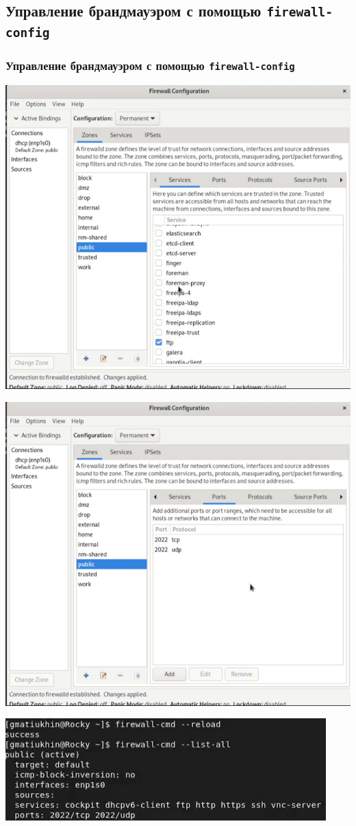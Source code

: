 \documentclass{beamer}
\begin{document}
\subsection{Управление брандмауэром с помощью \texttt{firewall-config}}
\begin{frame}[plain]
	\frametitle{Управление брандмауэром с помощью \texttt{firewall-config}}
	\includegraphics{12.png}
\end{frame}
\begin{frame}[plain]
	\includegraphics{13.png}
\end{frame}
\begin{frame}[plain]
	\includegraphics{14.png}
\end{frame}
\end{document}

